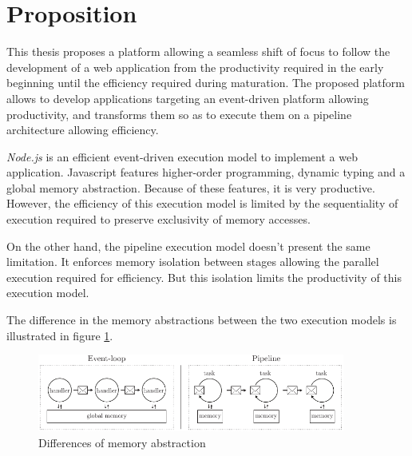 \section{Proposition} \label{chapter4:proposition}

This thesis proposes a platform allowing a seamless shift of focus to follow the development of a web application from the productivity required in the early beginning until the efficiency required during maturation.
The proposed platform allows to develop applications targeting an event-driven platform allowing productivity, and transforms them so as to execute them on a pipeline architecture allowing efficiency.

\textit{Node.js} is an efficient event-driven execution model to implement a web application.
Javascript features higher-order programming, dynamic typing and a global memory abstraction.
Because of these features, it is very productive.
However, the efficiency of this execution model is limited by the sequentiality of execution required to preserve exclusivity of memory accesses.

On the other hand, the pipeline execution model doesn't present the same limitation.
It enforces memory isolation between stages allowing the parallel execution required for efficiency.
But this isolation limits the productivity of this execution model.

The difference in the memory abstractions between the two execution models is illustrated in figure \ref{fig:difference}.


\begin{figure}[h!]
\begin{center}
\includegraphics[width=0.9\textwidth]{../resources/models-difference.pdf}
\end{center}
\caption{Differences of memory abstraction}
\label{fig:difference}
\end{figure}


